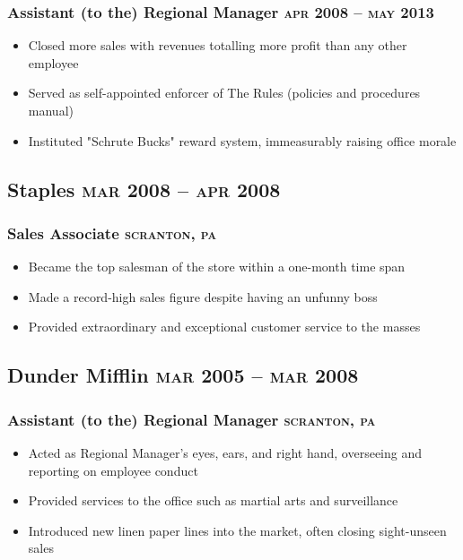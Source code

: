 \documentclass{article}
\newcommand{\rside}[1]{\hfill \normalfont\scshape\MakeLowercase{#1}}
\begin{document}
\subsubsection{Assistant (to the) Regional Manager \rside{Apr 2008 -- May 2013}}
\begin{itemize}
  \item Closed more sales with revenues totalling more profit than any other employee
  \item Served as self-appointed enforcer of The Rules (policies and procedures manual)
  \item Instituted "Schrute Bucks" reward system, immeasurably raising office morale
\end{itemize}
  
\subsection{Staples \rside{Mar 2008 -- Apr 2008}}
\subsubsection{Sales Associate \rside{Scranton, PA}}
\begin{itemize}
  \item Became the top salesman of the store within a one-month time span
  \item Made a record-high sales figure despite having an unfunny boss
  \item Provided extraordinary and exceptional customer service to the masses
\end{itemize}

\subsection{Dunder Mifflin \rside{Mar 2005 -- Mar 2008}}
\subsubsection{Assistant (to the) Regional Manager \rside{Scranton, PA}}
\begin{itemize}
  \item Acted as Regional Manager's eyes, ears, and right hand, overseeing and reporting on employee conduct
  \item Provided services to the office such as martial arts and surveillance
  \item Introduced new linen paper lines into the market, often closing sight-unseen sales
\end{itemize}
\end{document}
